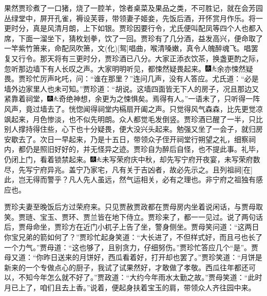果然贾珍煮了一口猪，烧了一腔羊，馀者桌菜及果品之类，不可胜记，就在会芳园丛绿堂中，屏开孔雀，褥设芙蓉，带领妻子姬妾，先饭后酒，开怀赏月作乐。将一更时分，真是风清月朗，上下如银。贾珍因要行令，尤氏便叫配凤等四个人也都入席，下面一溜坐下，猜枚划拳，饮了一回。贾珍有了几分酒，益发高兴，便命取了一竿紫竹箫来，命配凤吹箫，文{{(化)}}{[}鸳{]}唱曲，喉清嗓嫩，真令人魄醉魂飞。唱罢复又行令。那天将有三更时分，贾珍酒已八分。大家正添衣饮茶，换盏更酌之际，忽听那边墙下有人长叹之声。大家明明听见，都悚然疑畏起来。{\includegraphics[width=3mm]{../Images/00004}\includegraphics[width=3mm]{../Images/00012}\footnotesize \kaishu 余亦悚然疑畏。}贾珍忙厉声叱吒，问：“谁在那里？”连问几声，没有人答应。尤氏道：“必是墙外边家里人也未可知。”贾珍道：“胡说。这墙四面皆无下人的房子，况且那边又紧靠着祠堂，{\includegraphics[width=3mm]{../Images/00004}\includegraphics[width=3mm]{../Images/00012}\footnotesize \kaishu 奇绝神想，余更为之悚惧矣。}焉得有人。”一语未了，只听得一阵风声，竟过墙去了。恍惚闻得祠堂内槅扇开阖之声。只觉得风气森森，比先更觉凉飒起来，月色惨淡，也不似先明朗。众人都觉毛发倒竖。贾珍酒已醒了一半，只比别人撑持得住些，心下也十分疑畏，便大没兴头起来。勉强又坐了一会子，就归房安歇去了。次日一早起来，乃是十五日，带领众子侄开祠堂行朔望之礼，细察祠内，都仍是照旧好好的，并无怪异之迹。贾珍自为醉后自怪，也不提此事。礼毕，仍闭上门，看着锁禁起来。{\includegraphics[width=3mm]{../Images/00004}\includegraphics[width=3mm]{../Images/00012}\footnotesize \kaishu 未写荣府庆中秋，却先写宁府开夜宴，未写荣府数尽，先写宁府异兆。盖宁乃家宅，凡有关于吉凶者，故必先示之。且列祖祠{[}在{]}此，岂无得而警乎？凡人先人虽远，然气运相关，必有之理也。非宁府之祖独有感应也。}

贾珍夫妻至晚饭后方过荣府来。只见贾赦贾政都在贾母房内坐着说闲话，与贾母取笑。贾琏、宝玉、贾环、贾兰皆在地下侍立。贾珍来了，都一一见过。说了两句话后，贾母命坐，贾珍方在近门小杌子上告了坐，警身侧坐。贾母笑问道：“这两日你宝兄弟的箭如何了？”贾珍忙起身笑道：“大长进了，不但样式好，而且弓也长了一个力气。”贾母道：“这也够了，且别贪力，仔细努伤。”贾珍忙答应几个“是”。贾母又道：“你昨日送来的月饼好，西瓜看着好，打开却也罢了。”贾珍笑道：“月饼是新来的一个专做点心的厨子，我试了试果然好，才敢做了孝敬。西瓜往年都还可以，不知今年怎么就不好了。”贾政道：“大约今年雨水太勤之故。”贾母笑道：“此时月已上了，咱们且去上香。”说着，便起身扶着宝玉的肩，带领众人齐往园中来。

